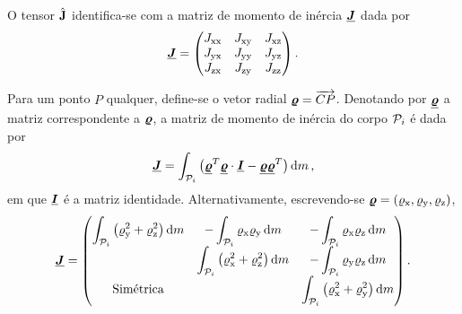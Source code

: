 O tensor \(\hat{\mathbf{J}}\) identifica-se com a matriz de momento de inércia \(\underline{\bm{J}}\) dada por
\begin{equation*}
	\underline{\bm{J}} =
	\begin{pmatrix}
		J_{\text{xx}} & J_{\text{xy}} & J_{\text{xz}} \\
		J_{\text{yx}} & J_{\text{yy}} & J_{\text{yz}} \\
		J_{\text{zx}} & J_{\text{zy}} & J_{\text{zz}}
	\end{pmatrix}.
\end{equation*}

Para um ponto \(P\) qualquer, define-se o vetor radial \(\bm{\varrho} = \overrightarrow{C P}\). Denotando por \(\underline{\bm{\varrho}}\) a matriz correspondente a \(\bm{\varrho}\), a matriz de momento de inércia do corpo \(\particlei\) é dada por
\begin{equation*}
	\matrixOfInertia = \int_{\particlei}\pqty{\transpose{\radialVectorMtx}\radialVectorMtx\cdot\identity - \radialVectorMtx\transpose{\radialVectorMtx}}\dd{m},
\end{equation*}
em que \(\underline{\bm{I}}\) é a matriz identidade. Alternativamente, escrevendo-se \(\radialVector = \explicitVectorCoordinates{\radialVectorScalar}\),
\begin{equation*}
	\matrixOfInertia =
	\begin{pmatrix}
		\dint_{\particlei} \pqty{\yComponent{\radialVectorScalar}^2 + \zComponent{\radialVectorScalar}^2} \dd{m}
		& - \dint_{\particlei} \xComponent{\radialVectorScalar}\yComponent{\radialVectorScalar} \dd{m}
		& - \dint_{\particlei} \xComponent{\radialVectorScalar}\zComponent{\radialVectorScalar} \dd{m} \\
		& \dint_{\particlei} \pqty{\xComponent{\radialVectorScalar}^2 + \zComponent{\radialVectorScalar}^2} \dd{m} 
		& - \dint_{\particlei} \yComponent{\radialVectorScalar}\zComponent{\radialVectorScalar} \dd{m} \\
		\text{Simétrica} 
		&  
		& \dint_{\particlei} \pqty{\xComponent{\radialVectorScalar}^2 + \yComponent{\radialVectorScalar}^2} \dd{m}
	\end{pmatrix}.
\end{equation*}


